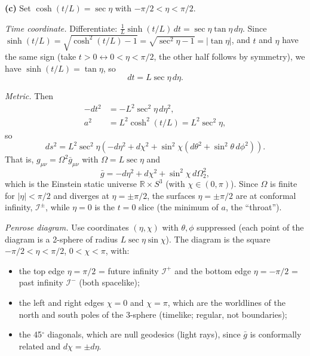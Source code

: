 \documentclass[12pt]{article}
\newcommand{\be}{\begin{equation}}
\newcommand{\ee}{\end{equation}}
\begin{document}
\textbf{(c)} Set $\cosh(t/L) = \sec\eta$ with $-\pi/2<\eta<\pi/2$.

\emph{Time coordinate.} Differentiate: $\frac{1}{L}\sinh(t/L)\,dt = \sec\eta\tan\eta\,d\eta$. Since $\sinh(t/L) = \sqrt{\cosh^2(t/L)-1} = \sqrt{\sec^2\eta-1} = |\tan\eta|$, and $t$ and $\eta$ have the same sign (take $t>0 \leftrightarrow 0<\eta<\pi/2$, the other half follows by symmetry), we have $\sinh(t/L)=\tan\eta$, so
\be
dt = L\sec\eta\, d\eta.
\ee

\emph{Metric.} Then
\begin{align*}
-dt^2 &= -L^2\sec^2\eta\, d\eta^2, \\
a^2 &= L^2\cosh^2(t/L) = L^2\sec^2\eta,
\end{align*}
so
\be
ds^2 = L^2\sec^2\eta\left(-d\eta^2 + d\chi^2 + \sin^2\chi\left(d\theta^2+\sin^2\theta\,d\phi^2\right)\right).
\ee
That is, $g_{\mu\nu} = \Omega^2\bar g_{\mu\nu}$ with $\Omega = L\sec\eta$ and
\be
\bar g = -d\eta^2 + d\chi^2 + \sin^2\chi\, d\Omega_2^2 ,
\ee
which is the Einstein static universe $\mathbb{R}\times S^3$ (with $\chi\in(0,\pi)$). Since $\Omega$ is finite for $|\eta|<\pi/2$ and diverges at $\eta=\pm\pi/2$, the surfaces $\eta=\pm\pi/2$ are at conformal infinity, $\mathcal{I}^\pm$, while $\eta=0$ is the $t=0$ slice (the minimum of $a$, the ``throat'').

\emph{Penrose diagram.} Use coordinates $(\eta,\chi)$ with $\theta,\phi$ suppressed (each point of the diagram is a 2-sphere of radius $L\sec\eta\sin\chi$). The diagram is the square $-\pi/2<\eta<\pi/2$, $0<\chi<\pi$, with:
\begin{itemize}
\item the top edge $\eta=\pi/2$ = future infinity $\mathcal{I}^+$ and the bottom edge $\eta=-\pi/2$ = past infinity $\mathcal{I}^-$ (both spacelike);
\item the left and right edges $\chi=0$ and $\chi=\pi$, which are the worldlines of the north and south poles of the 3-sphere (timelike; regular, not boundaries);
\item the 45$^\circ$ diagonals, which are null geodesics (light rays), since $\bar g$ is conformally related and $d\chi=\pm d\eta$.
\end{itemize}
\end{document}

